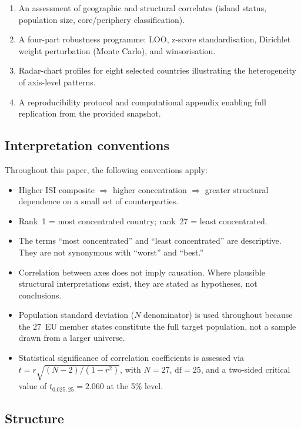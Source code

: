 \begin{enumerate}[leftmargin=2em]
    metrics documenting the degree to which the arithmetic-mean
    aggregation rule permits cross-axis compensation.
  \item An assessment of geographic and structural correlates (island
    status, population size, core/periphery classification).
  \item A four-part robustness programme: LOO, z-score
    standardisation, Dirichlet weight perturbation (Monte Carlo), and
    winsorisation.
  \item Radar-chart profiles for eight selected countries illustrating
    the heterogeneity of axis-level patterns.
  \item A reproducibility protocol and computational appendix enabling
    full replication from the provided snapshot.
\end{enumerate}

\subsection{Interpretation conventions}

Throughout this paper, the following conventions apply:

\begin{itemize}[leftmargin=2em]
  \item Higher ISI composite $\Rightarrow$ higher concentration
    $\Rightarrow$ greater structural dependence on a small set of
    counterparties.
  \item Rank~1 = most concentrated country; rank~27 = least
    concentrated.
  \item The terms ``most concentrated'' and ``least concentrated'' are
    descriptive.  They are not synonymous with ``worst'' and ``best.''
  \item Correlation between axes does not imply causation.  Where
    plausible structural interpretations exist, they are stated as
    hypotheses, not conclusions.
  \item Population standard deviation ($N$ denominator) is used
    throughout because the 27~EU member states constitute the full
    target population, not a sample drawn from a larger universe.
  \item Statistical significance of correlation
    coefficients is assessed via
    $t = r\sqrt{(N-2)/(1-r^2)}$, with $N = 27$,
    $\text{df} = 25$, and a two-sided critical value of
    $t_{0.025,25} = 2.060$ at the 5\% level.
\end{itemize}

\subsection{Structure}

